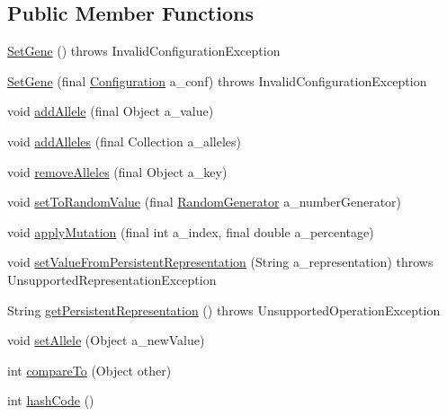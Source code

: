 \subsection*{Public Member Functions}
\begin{DoxyCompactItemize}
\item 
\hyperlink{classorg_1_1jgap_1_1impl_1_1_set_gene_ac64a9b4e313b8f28b6a517a049c53df2}{Set\-Gene} ()  throws Invalid\-Configuration\-Exception 
\item 
\hyperlink{classorg_1_1jgap_1_1impl_1_1_set_gene_a5f85f4032f83b7aee052f2b8df777b40}{Set\-Gene} (final \hyperlink{classorg_1_1jgap_1_1_configuration}{Configuration} a\-\_\-conf)  throws Invalid\-Configuration\-Exception 
\item 
void \hyperlink{classorg_1_1jgap_1_1impl_1_1_set_gene_a7fad65e8c8f8a36529f9c18d3dfcc59d}{add\-Allele} (final Object a\-\_\-value)
\item 
void \hyperlink{classorg_1_1jgap_1_1impl_1_1_set_gene_aca4464b4507861808afc1aa9737b6f61}{add\-Alleles} (final Collection a\-\_\-alleles)
\item 
void \hyperlink{classorg_1_1jgap_1_1impl_1_1_set_gene_a8c635cf990569b58a02b8fcdbe932ecd}{remove\-Alleles} (final Object a\-\_\-key)
\item 
void \hyperlink{classorg_1_1jgap_1_1impl_1_1_set_gene_a878678824034193a549e71c820f1bc7e}{set\-To\-Random\-Value} (final \hyperlink{interfaceorg_1_1jgap_1_1_random_generator}{Random\-Generator} a\-\_\-number\-Generator)
\item 
void \hyperlink{classorg_1_1jgap_1_1impl_1_1_set_gene_a25f48363b718e483e9b479a51aa9c017}{apply\-Mutation} (final int a\-\_\-index, final double a\-\_\-percentage)
\item 
void \hyperlink{classorg_1_1jgap_1_1impl_1_1_set_gene_aa2cb5e988d106f535d0c0a1e156d3dbc}{set\-Value\-From\-Persistent\-Representation} (String a\-\_\-representation)  throws Unsupported\-Representation\-Exception 
\item 
String \hyperlink{classorg_1_1jgap_1_1impl_1_1_set_gene_a2a35ceb76a665867ea10f34492dabf44}{get\-Persistent\-Representation} ()  throws Unsupported\-Operation\-Exception 
\item 
void \hyperlink{classorg_1_1jgap_1_1impl_1_1_set_gene_a3ba3b9efa4f1348e0ff4302cceeec6ae}{set\-Allele} (Object a\-\_\-new\-Value)
\item 
int \hyperlink{classorg_1_1jgap_1_1impl_1_1_set_gene_a658a2a0eb85cd1093cb140f4ed4042d9}{compare\-To} (Object other)
\item 
int \hyperlink{classorg_1_1jgap_1_1impl_1_1_set_gene_a7dac0c9a5d19e8bc680eb8c8107bc676}{hash\-Code} ()
\end{DoxyCompactItemize}
